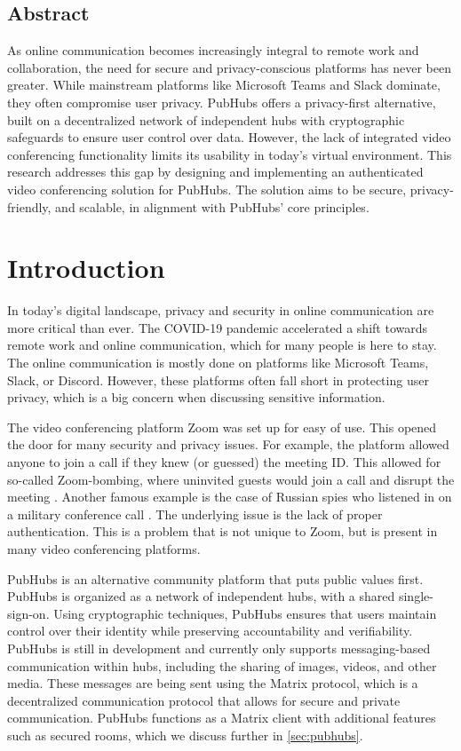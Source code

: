 \documentclass{report}
\begin{document}
\section*{Abstract}
As online communication becomes increasingly integral to remote work and collaboration, the need for secure and
privacy-conscious platforms has never been greater. While mainstream platforms like Microsoft Teams and Slack
dominate, they often compromise user privacy. PubHubs offers a  privacy-first alternative, built on a decentralized
network of independent hubs with cryptographic safeguards to ensure user control over data. However, the lack of
integrated video conferencing functionality limits its usability in today’s virtual environment. This research
addresses this gap by designing and implementing an authenticated video conferencing solution for PubHubs. The
solution aims to be secure, privacy-friendly, and scalable, in alignment with PubHubs’ core principles.


\tableofcontents
\chapter{Introduction}
In today's digital landscape, privacy and security in online communication are more critical than ever.
The COVID-19 pandemic accelerated a shift towards remote work and online communication, which for many people is here to stay.
The online communication is mostly done on platforms like Microsoft Teams, Slack, or Discord.
However, these platforms often fall short in protecting user privacy, which is a big concern when discussing sensitive
information.

The video conferencing platform Zoom was set up for easy of use. This opened the door for many security and privacy
issues. For example, the platform allowed anyone to join a call if they knew (or guessed) the meeting ID. This
allowed for so-called Zoom-bombing, where uninvited guests would join a call and disrupt the meeting \cite{ling_first_2021}.
Another famous example is the case of Russian spies who listened in on a military conference call \cite{
schmitz_germany_2024}. The underlying issue is the lack of proper authentication. This is a problem that is not
unique to Zoom, but is present in many video conferencing platforms.

PubHubs is an alternative community platform that puts public values first.
PubHubs is organized as a network of independent hubs, with a shared single-sign-on.
Using cryptographic techniques, PubHubs ensures that users maintain control over their identity while preserving
accountability and verifiability. PubHubs is still in development and currently only supports messaging-based
communication within hubs, including the sharing of images, videos, and other media. These messages are being
sent using the Matrix protocol, which is a decentralized communication protocol that allows for secure and private
communication. PubHubs functions as a Matrix client with additional features such as secured rooms, which we discuss
further in \autoref{sec:pubhubs}.
\end{document}
